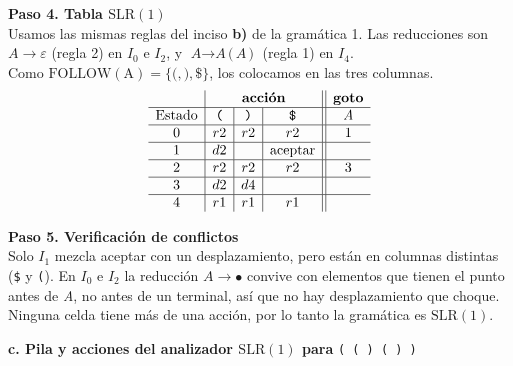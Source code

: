 \documentclass[12pt,letterpaper]{article}
\newcommand{\nt}[1]{\textit{#1}}
\newcommand{\tk}[1]{\texttt{#1}}
\newcommand{\tx}[1]{\text{#1}}
\newcommand{\Follow}[1]{\mathrm{FOLLOW}(#1)}
\newcommand{\slr}{\mathrm{SLR(1)}}
\newcommand{\eps}{\varepsilon}
\begin{document}
\begin{enumerate}[label=\arabic*.]
  \textbf{Paso 4. Tabla $\slr$}\\
  Usamos las mismas reglas del inciso \textbf{b)} de la gramática 1. Las reducciones son $\nt{A}\to\eps$
  (regla 2) en $I_0$ e $I_2$, y $\nt{A}\to\nt{A}\,\tk{(}\,\nt{A}\,\tk{)}$ (regla 1) en $I_4$.\\
  Como $\Follow{\tx{A}}=\{\tk{(},\tk{)},\tk{\$}\}$, los colocamos en las tres columnas.
  \[
  \begin{array}{c|c|c|c||c}
    & \multicolumn{3}{c||}{\textbf{acción}} & \textbf{goto} \\ \hline
    \text{Estado} & \tk{(} & \tk{)} & \tk{\$} & \nt{A} \\ \hline
    0 & r2 & r2 & r2 & 1 \\ \hline
    1 & d2 &    & \text{aceptar} &   \\ \hline
    2 & r2 & r2 & r2 & 3 \\ \hline
    3 & d2 & d4 &    &   \\ \hline
    4 & r1 & r1 & r1 &   \\
  \end{array}
  \]

  \textbf{Paso 5. Verificación de conflictos}\\
  Solo $I_1$ mezcla aceptar con un desplazamiento, pero están en columnas distintas (\tk{\$} y \tk{(}).
  En $I_0$ e $I_2$ la reducción $\nt{A}\to\bullet$ convive con elementos que tienen el punto antes de \nt{A},
  no antes de un terminal, así que no hay desplazamiento que choque.\\

  Ninguna celda tiene más de una acción, por lo tanto la gramática es $\slr$.

  \bigskip

  \newpage

  \textbf{\large c. Pila y acciones del analizador $\slr$ para} \tk{(\,(\,)\,(\,)\,)}\\


\end{enumerate}
\end{document}
